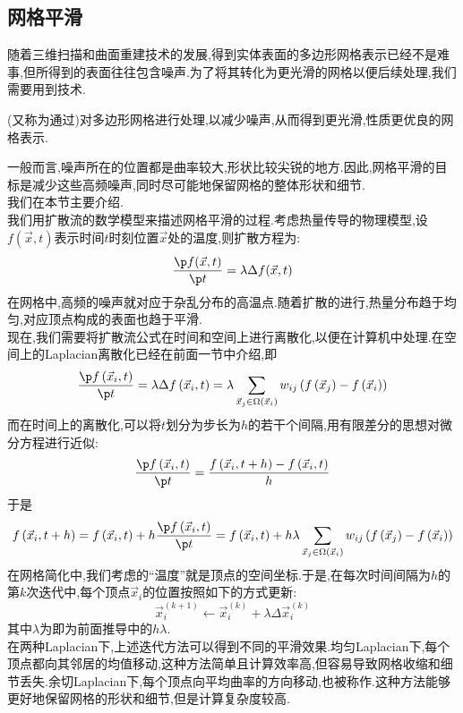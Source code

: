 \documentclass{ctexart}
\begin{document}
\subsection{网格平滑}
随着三维扫描和曲面重建技术的发展,得到实体表面的多边形网格表示已经不是难事,但所得到的表面往往包含噪声.为了将其转化为更光滑的网格以便后续处理,我们需要用到技术.
\begin{definition}[网格平滑]
    (又称为通过)对多边形网格进行处理,以减少噪声,从而得到更光滑,性质更优良的网格表示.
\end{definition}
一般而言,噪声所在的位置都是曲率较大,形状比较尖锐的地方.因此,网格平滑的目标是减少这些高频噪声,同时尽可能地保留网格的整体形状和细节.\\
\indent 我们在本节主要介绍.\\
\indent 我们用扩散流的数学模型来描述网格平滑的过程.考虑热量传导的物理模型,设$f(\vec{x},t)$表示时间$t$时刻位置$\vec{x}$处的温度,则扩散方程为:
\[\dfrac{\p f(\vec{x},t)}{\p t}=\lambda\Delta f(\vec{x},t)\]
在网格中,高频的噪声就对应于杂乱分布的高温点.随着扩散的进行,热量分布趋于均匀,对应顶点构成的表面也趋于平滑.\\
\indent 现在,我们需要将扩散流公式在时间和空间上进行离散化,以便在计算机中处理.在空间上的Laplacian离散化已经在前面一节中介绍,即
\[\dfrac{\p f\left(\vec{x}_i,t\right)}{\p t}=\lambda\Delta f\left(\vec{x}_i,t\right)=\lambda\sum_{\vec{x}_j\in\Omega\left(\vec{x}_i\right)}w_{ij}\left(f\left(\vec{x}_j\right)-f\left(\vec{x}_i\right)\right)\]
而在时间上的离散化,可以将$t$划分为步长为$h$的若干个间隔,用有限差分的思想对微分方程进行近似:
\[\dfrac{\p f\left(\vec{x}_i,t\right)}{\p t}=\dfrac{f\left(\vec{x}_i,t+h\right)-f\left(\vec{x}_i,t\right)}{h}\]
于是
\[f\left(\vec{x}_i,t+h\right)=f\left(\vec{x}_i,t\right)+h\dfrac{\p f\left(\vec{x}_i,t\right)}{\p t}=f\left(\vec{x}_i,t\right)+h\lambda\sum_{\vec{x}_j\in\Omega\left(\vec{x}_i\right)}w_{ij}\left(f\left(\vec{x}_j\right)-f\left(\vec{x}_i\right)\right)\]
\indent 在网格简化中,我们考虑的``温度''就是顶点的空间坐标.于是,在每次时间间隔为$h$的第$k$次迭代中,每个顶点$\vec{x}_i$的位置按照如下的方式更新:
\[\vec{x}_i^{(k+1)}\leftarrow\vec{x}_i^{(k)}+\lambda\Delta\vec{x}_i^{(k)}\]
其中$\lambda$为即为前面推导中的$h\lambda$.\\
\indent 在两种Laplacian下,上述迭代方法可以得到不同的平滑效果.均匀Laplacian下,每个顶点都向其邻居的均值移动,这种方法简单且计算效率高,但容易导致网格收缩和细节丢失.余切Laplacian下,每个顶点向平均曲率的方向移动,也被称作.这种方法能够更好地保留网格的形状和细节,但是计算复杂度较高.
\end{document}

